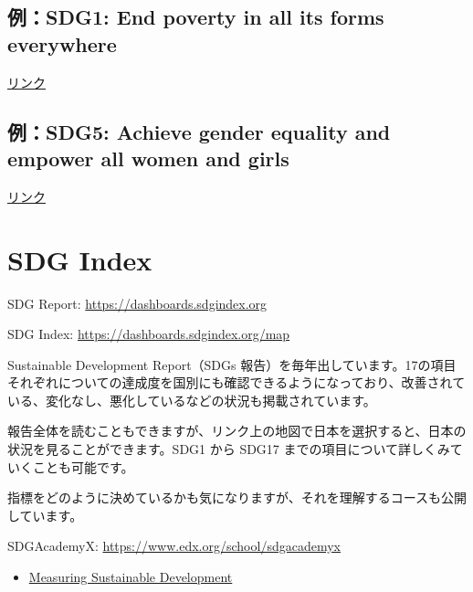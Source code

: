 \documentclass[
  xelatex, ja=standard]{bxjsbook}
\providecommand{\tightlist}{%
  \setlength{\itemsep}{0pt}\setlength{\parskip}{0pt}}
\theoremstyle{definition}
\theoremstyle{definition}
\theoremstyle{definition}
\theoremstyle{definition}
\theoremstyle{remark}
\begin{document}
\hypertarget{ux4f8bsdg1-end-poverty-in-all-its-forms-everywhere}{%
\subsection{\texorpdfstring{例：SDG1: \textbf{End poverty in all its forms everywhere}}{例：SDG1: End poverty in all its forms everywhere}}\label{ux4f8bsdg1-end-poverty-in-all-its-forms-everywhere}}

\href{https://ourworldindata.org/grapher/share-of-population-in-extreme-poverty}{リンク}

\hypertarget{ux4f8bsdg5-achieve-gender-equality-and-empower-all-women-and-girls}{%
\subsection{\texorpdfstring{例：SDG5: \textbf{Achieve gender equality and empower all women and girls}}{例：SDG5: Achieve gender equality and empower all women and girls}}\label{ux4f8bsdg5-achieve-gender-equality-and-empower-all-women-and-girls}}

\href{https://ourworldindata.org/grapher/overarching-legal-frameworks-regarding-gender-equality}{リンク}

\hypertarget{sdg-index}{%
\section{SDG Index}\label{sdg-index}}

SDG Report: \url{https://dashboards.sdgindex.org}

SDG Index: \url{https://dashboards.sdgindex.org/map}

Sustainable Development Report（SDGs 報告）を毎年出しています。17の項目それぞれについての達成度を国別にも確認できるようになっており、改善されている、変化なし、悪化しているなどの状況も掲載されています。

報告全体を読むこともできますが、リンク上の地図で日本を選択すると、日本の状況を見ることができます。SDG1 から SDG17 までの項目について詳しくみていくことも可能です。

指標をどのように決めているかも気になりますが、それを理解するコースも公開しています。

SDGAcademyX: \url{https://www.edx.org/school/sdgacademyx}

\begin{itemize}
\tightlist
\item
  \href{https://www.edx.org/learn/sustainable-development/sdg-academy-measuring-sustainable-development?webview=false\&campaign=Measuring+Sustainable+Development\&source=edx\&product_category=course\&placement_url=https\%3A\%2F\%2Fwww.edx.org\%2Fschool\%2Fsdgacademyx}{Measuring Sustainable Development}
\end{itemize}
\end{document}
